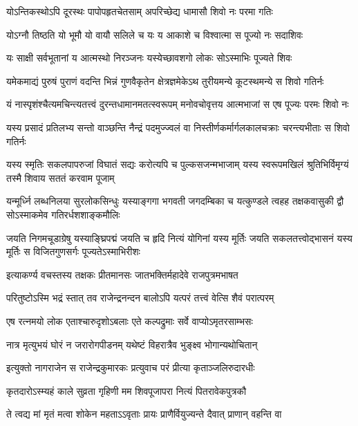 \begin{center}
\twolineshloka
{योऽन्तिकस्थोऽपि दूरस्थः पापोपहृतचेतसाम्}
{अपरिच्छेद्य धामासौ शिवो नः परमा गतिः} %

\twolineshloka
{योऽग्नौ तिष्ठति यो भूमौ यो वायौ सलिले च यः}
{य आकाशे च विश्वात्मा स पूज्यो नः सदाशिवः} %

\twolineshloka
{यः साक्षी सर्वभूतानां य आत्मस्थो निरञ्जनः}
{यस्येच्छावशगो लोकः सोऽस्माभिः पूज्यते शिवः} %

\fourlineindentedshloka
{यमेकमाद्यं पुरुषं पुराणं}
{वदन्ति भिन्नं गुणवैकृतेन}
{क्षेत्रज्ञमेकेऽथ तुरीयमन्ये}
{कूटस्थमन्ये स शिवो गतिर्नः} %

\fourlineindentedshloka
{यं नास्पृशंश्चैत्यमचिन्त्यतत्त्वं}
{दुरन्तधामानमतत्स्वरूपम्}
{मनोवचोवृत्तय आत्मभाजां}
{स एष पूज्यः परमः शिवो नः} %

\fourlineindentedshloka
{यस्य प्रसादं प्रतिलभ्य सन्तो}
{वाञ्छन्ति नैन्द्रं पदमुज्ज्वलं वा}
{निस्तीर्णकर्मार्गलकालचक्राः}
{चरन्त्यभीताः स शिवो गतिर्नः} %

\fourlineindentedshloka
{यस्य स्मृतिः सकलपापरुजां विघातं}
{सद्यः करोत्यपि च पुल्कसजन्मभाजाम्}
{यस्य स्वरूपमखिलं श्रुतिभिर्विमृग्यं}
{तस्मै शिवाय सततं करवाम पूजाम्} %

\fourlineindentedshloka
{यन्मूर्ध्नि लब्धनिलया सुरलोकसिन्धुः}
{यस्याङ्गगा भगवती जगदम्बिका च}
{यत्कुण्डले त्वहह तक्षकवासुकी द्वौ}
{सोऽस्माकमेव गतिरर्धशशाङ्कमौलिः} %

\fourlineindentedshloka
{जयति निगमचूडाग्रेषु यस्याङ्घ्रिपद्मं}
{जयति च हृदि नित्यं योगिनां यस्य मूर्तिः}
{जयति सकलतत्त्वोद्भासनं यस्य मूर्तिः}
{स विजितगुणसर्गः पूज्यतेऽस्माभिरीशः} %

\twolineshloka
{इत्याकर्ण्य वचस्तस्य तक्षकः प्रीतमानसः}
{जातभक्तिर्महादेवे राजपुत्रमभाषत} %

\twolineshloka
{परितुष्टोऽस्मि भद्रं स्तात् तव राजेन्द्रनन्दन}
{बालोऽपि यत्परं तत्त्वं वेत्सि शैवं परात्परम्} %

\twolineshloka
{एष रत्नमयो लोक एताश्चारुदृशोऽबलाः}
{एते कल्पद्रुमाः सर्वे वाप्योऽमृतरसाम्भसः} %

\twolineshloka
{नात्र मृत्युभयं घोरं न जरारोगपीडनम्}
{यथेष्टं विहरात्रैव भुङ्क्ष्व भोगान्यथोचितान्} %

\twolineshloka
{इत्युक्तो नागराजेन स राजेन्द्रकुमारकः}
{प्रत्युवाच परं प्रीत्या कृताञ्जलिरुदारधीः} %

\twolineshloka
{कृतदारोऽस्म्यहं काले सुव्रता गृहिणी मम}
{शिवपूजापरा नित्यं पितरावेकपुत्रकौ} %

\twolineshloka
{ते त्वद्य मां मृतं मत्वा शोकेन महताऽऽवृताः}
{प्रायः प्राणैर्वियुज्यन्ते दैवात् प्राणान् वहन्ति वा} %


\end{center}
